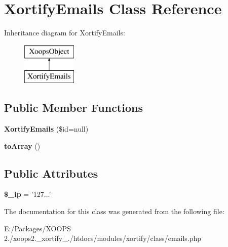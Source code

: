 \hypertarget{class_xortify_emails}{\section{Xortify\-Emails Class Reference}
\label{class_xortify_emails}
}
Inheritance diagram for Xortify\-Emails\-:\begin{figure}[H]
\begin{center}
\leavevmode
\includegraphics[height=2.000000cm]{class_xortify_emails}
\end{center}
\end{figure}
\subsection*{Public Member Functions}
\begin{DoxyCompactItemize}
\item 
\hypertarget{class_xortify_emails_a8d7aeff292d95baf5a9317948210a3a1}{{\bfseries Xortify\-Emails} (\$id=null)}\label{class_xortify_emails_a8d7aeff292d95baf5a9317948210a3a1}

\item 
\hypertarget{class_xortify_emails_abab2bf820f27e12a05e7288a62135dfc}{{\bfseries to\-Array} ()}\label{class_xortify_emails_abab2bf820f27e12a05e7288a62135dfc}

\end{DoxyCompactItemize}
\subsection*{Public Attributes}
\begin{DoxyCompactItemize}
\item 
\hypertarget{class_xortify_emails_ad0bea48de8ce5b467524ec3fd8bdfdec}{{\bfseries \$\-\_\-ip} = '127...'}\label{class_xortify_emails_ad0bea48de8ce5b467524ec3fd8bdfdec}

\end{DoxyCompactItemize}


The documentation for this class was generated from the following file\-:\begin{DoxyCompactItemize}
\item 
E\-:/\-Packages/\-X\-O\-O\-P\-S 2./xoops2.\-\_\-xortify\-\_./htdocs/modules/xortify/class/emails.\-php\end{DoxyCompactItemize}
